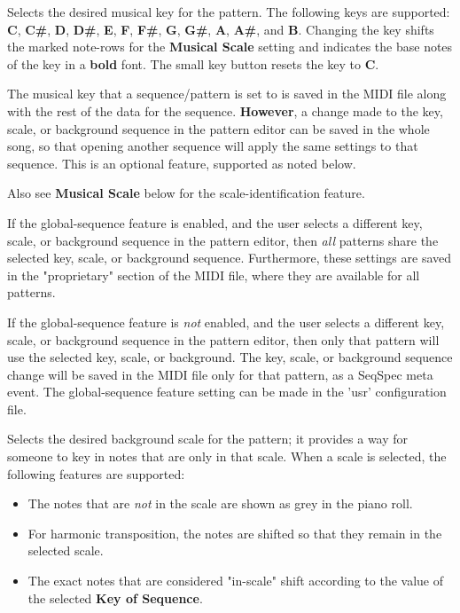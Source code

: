    Selects the desired musical key for the pattern.  The following keys are
   supported:
   \textbf{C}, \textbf{C\#},
   \textbf{D}, \textbf{D\#},
   \textbf{E}, \textbf{F}, \textbf{F\#},
   \textbf{G}, \textbf{G\#},
   \textbf{A}, \textbf{A\#},
   and \textbf{B}.
   Changing the key shifts the marked note-rows
   for the \textbf{Musical Scale} setting and indicates the base notes
   of the key in a \textbf{bold} font.
   The small key button resets the key to \textbf{C}.

   The musical key that a sequence/pattern is set to is
   saved in the MIDI file along with the rest of the data for the sequence.
   \textbf{However},
   a change made to the key, scale, or background sequence in
   the pattern editor can be saved in the whole song,
   so that opening another sequence
   will apply the same settings to that sequence.  This is an optional feature,
   supported as noted below.

   Also see \textbf{Musical Scale} below for the scale-identification feature.

   If the global-sequence feature is enabled, and the user selects
   a different key, scale, or background sequence in the pattern editor, 
   then \textsl{all} patterns share the selected key, scale, or background
   sequence.  Furthermore, these settings are saved in the "proprietary"
   section of the MIDI file, where they are available for all patterns.

   If the global-sequence feature is \textsl{not} enabled, and the user selects
   a different key, scale, or background sequence in the pattern editor, 
   then only that pattern will use the selected key, scale, or background.
   The key, scale, or background sequence change will be saved in the MIDI file
   only for that pattern, as a SeqSpec meta event.
   The global-sequence feature setting can be made in the 'usr' configuration
   file.

   Selects the desired background scale for the pattern; it provides a way for
   someone to key in notes that are only in that scale.
   When a scale is selected, the following features are supported:

   \begin{itemize}
      \item The notes that are \textsl{not}
         in the scale are shown as grey in the piano roll.
      \item For harmonic transposition, the notes are shifted
         so that they remain in the selected scale.
      \item The exact notes that are considered "in-scale" shift according
         to the value of the selected \textbf{Key of Sequence}.
   \end{itemize}

